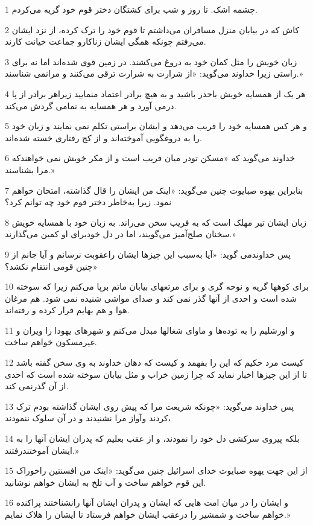\par 1 چشمه اشک. تا روز و شب برای کشتگان دختر قوم خود گریه می‌کردم.
\par 2 کاش که در بیابان منزل مسافران می‌داشتم تا قوم خود را ترک کرده، از نزد ایشان می‌رفتم چونکه همگی ایشان زناکارو جماعت خیانت کارند.
\par 3 زبان خویش را مثل کمان خود به دروغ می‌کشند. در زمین قوی شده‌اند اما نه برای راستی زیرا خداوند می‌گوید: «از شرارت به شرارت ترقی می‌کنند و مرانمی شناسند.»
\par 4 هر یک از همسایه خویش باحذر باشید و به هیچ برادر اعتماد منمایید زیراهر برادر از پا درمی آورد و هر همسایه به نمامی گردش می‌کند.
\par 5 و هر کس همسایه خود را فریب می‌دهد و ایشان براستی تکلم نمی نمایند و زبان خود را به دروغگویی آموخته‌اند و از کج رفتاری خسته شده‌اند.
\par 6 خداوند می‌گوید که «مسکن تودر میان فریب است و از مکر خویش نمی خواهندکه مرا بشناسند.»
\par 7 بنابراین یهوه صبایوت چنین می‌گوید: «اینک من ایشان را قال گذاشته، امتحان خواهم نمود. زیرا به‌خاطر دختر قوم خود چه توانم کرد؟
\par 8 زبان ایشان تیر مهلک است که به فریب سخن می‌راند. به زبان خود با همسایه خویش سخنان صلح‌آمیز می‌گویند، اما در دل خودبرای او کمین می‌گذارند.»
\par 9 پس خداوندمی گوید: «آیا به‌سبب این چیزها ایشان راعقوبت نرسانم و آیا جانم از چنین قومی انتقام نکشد؟»
\par 10 برای کوهها گریه و نوحه گری و برای مرتعهای بیابان ماتم برپا می‌کنم زیرا که سوخته شده است و احدی از آنها گذر نمی کند و صدای مواشی شنیده نمی شود. هم مرغان هوا و هم بهایم فرار کرده و رفته‌اند.
\par 11 و اورشلیم را به توده‌ها و ماوای شغالها مبدل می‌کنم و شهرهای یهودا را ویران و غیرمسکون خواهم ساخت.
\par 12 کیست مرد حکیم که این را بفهمد و کیست که دهان خداوند به وی سخن گفته باشد تا از این چیزها اخبار نماید که چرا زمین خراب و مثل بیابان سوخته شده است که احدی از آن گذرنمی کند.
\par 13 پس خداوند می‌گوید: «چونکه شریعت مرا که پیش روی ایشان گذاشته بودم ترک کردند وآواز مرا نشنیدند و در آن سلوک ننمودند،
\par 14 بلکه پیروی سرکشی دل خود را نمودند، و از عقب بعلیم که پدران ایشان آنها را به ایشان آموختندرفتند.»
\par 15 از این جهت یهوه صبایوت خدای اسرائیل چنین می‌گوید: «اینک من افسنتین راخوراک این قوم خواهم ساخت و آب تلخ به ایشان خواهم نوشانید.
\par 16 و ایشان را در میان امت هایی که ایشان و پدران ایشان آنها رانشناختند پراکنده خواهم ساخت و شمشیر را درعقب ایشان خواهم فرستاد تا ایشان را هلاک نمایم.»
